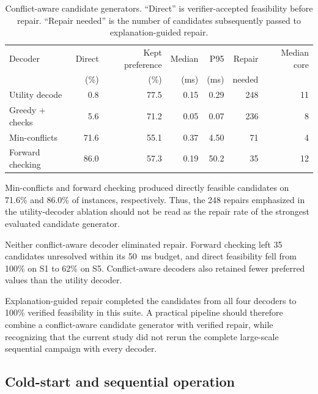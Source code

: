\documentclass[pdflatex,sn-mathphys-num,iicol,oneside]{sn-jnl}
\begin{document}
\begin{table}[t]
\centering
\caption{
Conflict-aware candidate generators. ``Direct'' is verifier-accepted
feasibility before repair. ``Repair needed'' is the number of
candidates subsequently passed to explanation-guided repair.
}
\label{tab:decoders}
\setlength{\tabcolsep}{3.5pt}
\small

\begin{tabular}{lrrrrrr}
\toprule
Decoder &
Direct &
Kept preference &
Median &
P95 &
Repair &
Median core\\
&
(\%) &
(\%) &
(ms) &
(ms) &
needed &
\\
\midrule

Utility decode
& 0.8 & 77.5 & 0.15 & 0.29 & 248 & 11\\

Greedy + checks
& 5.6 & 71.2 & 0.05 & 0.07 & 236 & 8\\

Min-conflicts
& 71.6 & 55.1 & 0.37 & 4.50 & 71 & 4\\

Forward checking
& 86.0 & 57.3 & 0.19 & 50.2 & 35 & 12\\

\bottomrule
\end{tabular}
\normalsize
\end{table}

Min-conflicts and forward checking produced directly feasible
candidates on 71.6\% and 86.0\% of instances, respectively. Thus, the
248 repairs emphasized in the utility-decoder ablation should not be
read as the repair rate of the strongest evaluated candidate
generator.

Neither conflict-aware decoder eliminated repair. Forward checking
left 35 candidates unresolved within its 50~ms budget, and direct
feasibility fell from 100\% on S1 to 62\% on S5. Conflict-aware
decoders also retained fewer preferred values than the utility
decoder.

Explanation-guided repair completed the candidates from all four
decoders to 100\% verified feasibility in this suite. A practical
pipeline should therefore combine a conflict-aware candidate generator
with verified repair, while recognizing that the current study did
not rerun the complete large-scale sequential campaign with every
decoder.

\subsection{Cold-start and sequential operation}
\label{sec:amortized-results}
\end{document}
